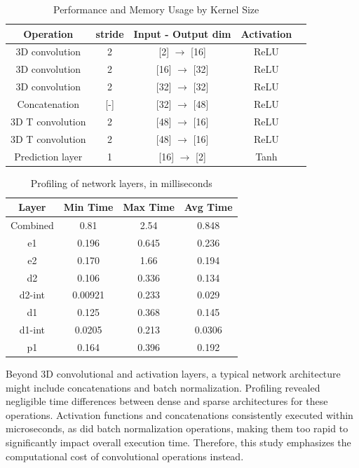 \documentclass{article}
\begin{document}
\begin{table}[H]
    \centering
    \begin{tabular}{|c|c|c|c|c|}
        \hline
        Operation & stride & Input - Output dim & Activation \\
        \hline
        3D convolution   & 2 & [2] $\rightarrow$ [16] & ReLU   \\
        3D convolution   & 2 & [16] $\rightarrow$ [32] & ReLU \\
        3D convolution & 2 & [32] $\rightarrow$ [32] & ReLU \\
        Concatenation & [-] & [32] $\rightarrow$ [48] & ReLU  \\
        3D T convolution & 2 &[48] $\rightarrow$ [16] & ReLU \\
        3D T convolution & 2 & [48] $\rightarrow$ [16] & ReLU \\
        Prediction layer & 1 & [16] $\rightarrow$ [2] & Tanh \\
        \hline
    \end{tabular}
    \caption{Performance and Memory Usage by Kernel Size}
    \label{tab:kernel_performance}
\end{table}

\begin{table}[ht]
    \centering
    \begin{tabular}{|c|c|c|c|}
        \hline
        Layer & Min Time & Max Time & Avg Time \\
        \hline
        Combined   & 0.81 & 2.54 & 0.848  \\
        e1   & 0.196 & 0.645 & 0.236 \\
        e2 & 0.170 & 1.66 & 0.194  \\
        d2 & 0.106 & 0.336 & 0.134  \\
        d2-int & 0.00921 & 0.233 & 0.029  \\
        d1 & 0.125 & 0.368 & 0.145  \\
        d1-int & 0.0205 & 0.213 & 0.0306  \\
        p1 & 0.164 & 0.396 & 0.192  \\
        \hline
    \end{tabular}
    \caption{Profiling of network layers, in milliseconds}
    \label{tab:kernel_performance}
\end{table}

Beyond 3D convolutional and activation layers, a typical network architecture might include concatenations and batch normalization. Profiling revealed negligible time differences between dense and sparse architectures for these operations. Activation functions and concatenations consistently executed within microseconds, as did batch normalization operations, making them too rapid to significantly impact overall execution time. Therefore, this study emphasizes the computational cost of convolutional operations instead.
\end{document}
